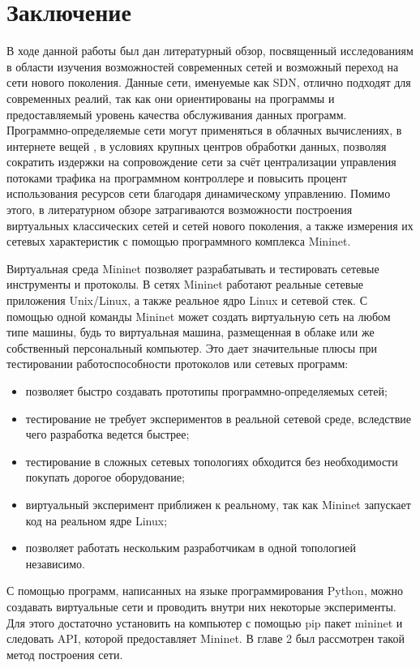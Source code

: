 \chapter*{Заключение}

В ходе данной работы был дан литературный обзор, посвященный
исследованиям в области изучения возможностей современных сетей и
возможный переход на сети нового поколения. Данные сети, именуемые как
SDN, отлично подходят для современных реалий, так как они ориентированы
на программы и предоставляемый уровень качества обслуживания данных
программ. Программно-определяемые сети могут применяться в облачных
вычислениях, в интернете вещей \cite{iot}, в условиях крупных
центров обработки данных, позволяя сократить издержки на сопровождение
сети за счёт централизации управления потоками трафика на программном
контроллере и повысить процент использования ресурсов сети благодаря
динамическому управлению. Помимо этого, в литературном обзоре
затрагиваются возможности построения виртуальных классических сетей и
сетей нового поколения, а также измерения их сетевых характеристик с
помощью программного комплекса Mininet.

Виртуальная среда Mininet позволяет разрабатывать и тестировать
сетевые инструменты и протоколы. В сетях Mininet работают реальные
сетевые приложения Unix/Linux, а также реальное ядро Linux и сетевой
стек. С помощью одной команды Mininet может создать виртуальную сеть
на любом типе машины, будь то виртуальная машина, размещенная в облаке
или же собственный персональный компьютер. Это дает значительные плюсы
при тестировании работоспособности протоколов или сетевых программ:
\begin{itemize}
\item позволяет быстро создавать прототипы программно-определяемых
  сетей;
\item тестирование не требует экспериментов в реальной сетевой среде,
  вследствие чего разработка ведется быстрее;
\item тестирование в сложных сетевых топологиях обходится без
  необходимости покупать дорогое оборудование;
\item виртуальный эксперимент приближен к реальному, так как Mininet
  запускает код на реальном ядре Linux;
\item позволяет работать нескольким разработчикам в одной топологией
  независимо.
\end{itemize}

С помощью программ, написанных на языке программирования Python, можно
создавать виртуальные сети и проводить внутри них некоторые
эксперименты. Для этого достаточно установить на компьютер с помощью
pip пакет mininet и следовать API, которой предоставляет Mininet. В
главе 2 был рассмотрен такой метод построения сети.

